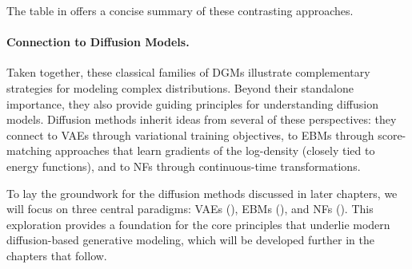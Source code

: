 The table in  offers a concise summary of these contrasting approaches.


\begin{table}[th]
  \caption{Comparison of Explicit and Implicit Generative Models}
  \small
  \centering
  \label{tb:comparison-explicit-implicit}
\end{table}


\paragraph{Connection to Diffusion Models.}
Taken together, these classical families of DGMs illustrate complementary strategies for modeling complex distributions.  
Beyond their standalone importance, they also provide guiding principles for understanding diffusion models.  
Diffusion methods inherit ideas from several of these perspectives: they connect to VAEs through variational training objectives, to EBMs through score-matching approaches that learn gradients of the log-density (closely tied to energy functions), and to NFs through continuous-time transformations.  

To lay the groundwork for the diffusion methods discussed in later chapters, we will focus on three central paradigms: VAEs (), EBMs (), and NFs ().  
This exploration provides a foundation for the core principles that underlie modern diffusion-based generative modeling, which will be developed further in the chapters that follow.



